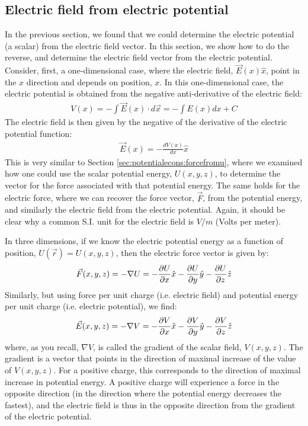 \subsection{Electric field from electric potential}
In the previous section, we found that we could determine the electric potential (a scalar) from the electric field vector. In this section, we show how to do the reverse, and determine the electric field vector from the electric potential. Consider, first, a one-dimensional case, where the electric field, $\vec E(x) \hat x$, point in the $x$ direction and depends on position, $x$. In this one-dimensional case, the electric potential is obtained from the negative anti-derivative of the electric field:
\begin{align*}
V(x)=-\int \vec E(x)\cdot d\vec x=-\int E(x) dx + C
\end{align*}
The electric field is then given by the negative of the derivative of the electric potential function:
\begin{align*}
\vec E(x) = -\frac{dV(x)}{dx}\hat x
\end{align*}
This is very similar to Section \ref{sec:potentialecons:forcefromu}, where we examined how one could use the scalar potential energy, $U(x,y,z)$, to determine the vector for the force associated with that potential energy. The same holds for the electric force, where we can recover the force vector, $\vec F$, from the potential energy, and similarly the electric field from the electric potential. Again, it should be clear why a common S.I. unit for the electric field is $\si{V/m}$ (Volts per meter). 

In three dimensions, if we know the electric potential energy as a function of position, $U(\vec r)=U(x,y,z)$, then the electric force vector is given by:
\begin{align*}
\vec F(x,y,z) =- \nabla U=-\frac{\partial U}{\partial x}\hat x-\frac{\partial U}{\partial y}\hat y-\frac{\partial U}{\partial z}\hat z
\end{align*}
Similarly, but using force per unit charge (i.e. electric field) and potential energy per unit charge (i.e. electric potential), we find:
\begin{align*}
\vec E(x,y,z) = -\nabla V =-\frac{\partial V}{\partial x}\hat x-\frac{\partial V}{\partial y}\hat y-\frac{\partial V}{\partial z}\hat z
\end{align*}
where, as you recall, $\nabla V$, is called the gradient of the scalar field, $V(x,y,z)$. The gradient is a vector that points in the direction of maximal increase of the value of $V(x,y,z)$. For a positive charge, this corresponds to the direction of maximal increase in potential energy. A positive charge will experience a force in the opposite direction (in the direction where the potential energy decreases the fastest), and the electric field is thus in the opposite direction from the gradient of the electric potential.

